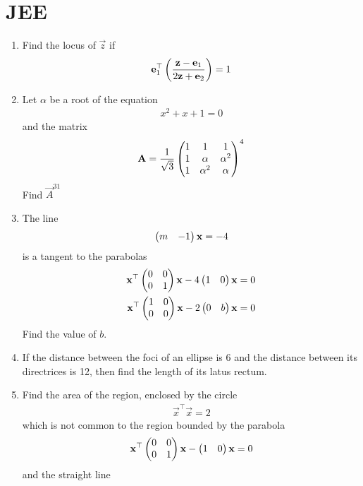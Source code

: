 \documentclass[journal,12pt,twocolumn]{IEEEtran}
\renewcommand\thesection{\arabic{section}}
\begin{document}
\section{JEE}
\renewcommand{\theequation}{\theenumi}
\begin{enumerate}[label=\thesection.\arabic*.,ref=\thesection.\theenumi]
\item Find the locus of $\vec{z}$ if 
\begin{align}
	\mathbf{e}_1^{\top}\left(\frac{\mathbf{z}-\mathbf{e}_1}{2\mathbf{z}+\mathbf{e}_2}\right) = 1
\end{align}
\item Let $\alpha$ be a root of the equation
\begin{align}
	x^2+x+1 = 0
\end{align}
and the matrix 
\begin{align}
	\mathbf{A} = 	\frac{1}{\sqrt{3}}\begin{pmatrix}1 & 1 & 1\\ 1 & \alpha &  \alpha^2 \\ 1 & \alpha^2  & \alpha\end{pmatrix}^4 
\end{align}
		Find $\vec{A}^31$
	\item The line 
\begin{align}
	\begin{pmatrix}m & -1\end{pmatrix}\mathbf{x} = -4
\end{align}
is a tangent to the parabolas
\begin{align}
	\mathbf{x}^{\top}\begin{pmatrix}0 & 0 \\ 0 &  1\end{pmatrix}\mathbf{x} - 4 \begin{pmatrix}1 & 0\end{pmatrix}\mathbf{x}&= 0
	\\
	\mathbf{x}^{\top}\begin{pmatrix}1 & 0 \\ 0  & 0\end{pmatrix}\mathbf{x} - 2 \begin{pmatrix}0 & b\end{pmatrix}\mathbf{x}&= 0
\end{align}
Find the value of $b$.
\item If the distance between the foci of an ellipse is 6 and the distance between its directrices is
	12, then find the length of its latus rectum.
\item Find the area of the region, enclosed by the circle 
\begin{align}
	\vec{x}^{\top}\vec{x} = 2
\end{align}
which is not common to the region bounded by the parabola 
\begin{align}
	\mathbf{x}^{\top}\begin{pmatrix}0 & 0 \\ 0 &  1\end{pmatrix}\mathbf{x} -  \begin{pmatrix}1 & 0\end{pmatrix}\mathbf{x}= 0
\end{align}
and the straight line
\begin{align}

\end{align}
\end{enumerate}
\end{document}
